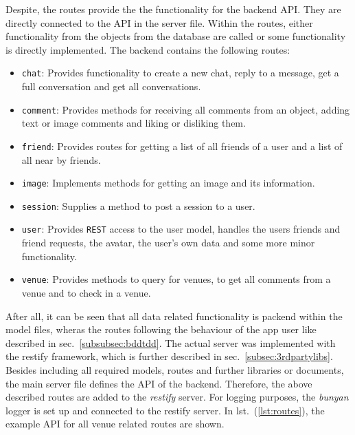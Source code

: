 Despite, the routes provide the the functionality for the backend API. They are directly connected to the API in the server file. Within the routes, either functionality from the objects from the database are called or some functionality is directly implemented. The backend contains the following routes:
\begin{itemize}
	\item \texttt{chat}: Provides functionality to create a new chat, reply to a message, get a full conversation and get all conversations.
	\item \texttt{comment}: Provides methods for receiving all comments from an object, adding text or image comments and liking or disliking them.
	\item \texttt{friend}: Provides routes for getting a list of all friends of a user and a list of all near by friends.
	\item \texttt{image}: Implements methods for getting an image and its information.
	\item \texttt{session}: Supplies a method to post a session to a user.
	\item \texttt{user}: Provides \texttt{REST} access to the user model, handles the users friends and friend requests, the avatar, the user's own data and some more minor functionality. 
	\item \texttt{venue}: Provides methods to query for venues, to get all comments from a venue and to check in a venue.
	
\end{itemize} 
After all, it can be seen that all data related functionality is packend within the model files, wheras the routes following the behaviour of the app user like described in sec.\ \ref{subsubsec:bddtdd}.
\newline\newline
The actual server was implemented with the restify framework, which is further described in sec.\ \ref{subsec:3rdpartylibs}. Besides including all required models, routes and further libraries or documents, the main server file defines the API of the backend. Therefore, the above described routes are added to the \textit{restify} server. For logging purposes, the \textit{bunyan} logger is set up and connected to the restify server. In lst.\ (\ref{lst:routes}),  the example API for all venue related routes are shown.


